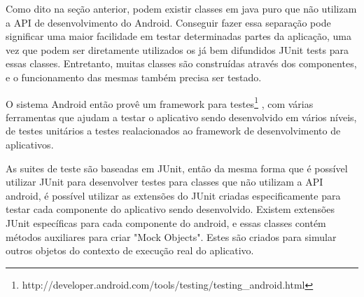 Como dito na seção anterior, podem existir classes em java puro que não utilizam a API de desenvolvimento do Android. Conseguir fazer essa separação pode significar uma maior facilidade em testar determinadas partes da aplicação, uma vez que podem ser diretamente utilizados os já bem difundidos JUnit tests para essas classes. Entretanto, muitas classes são construídas através dos componentes, e o funcionamento das mesmas também precisa ser testado.

O sistema Android então provê um framework para testes\footnote{http://developer.android.com/tools/testing/testing\_android.html} , com várias ferramentas que ajudam a testar o aplicativo sendo desenvolvido em vários níveis, de testes unitários a testes realacionados ao framework de desenvolvimento de aplicativos. 

As suites de teste são baseadas em JUnit, então da mesma forma que é possível utilizar JUnit para desenvolver testes para classes que não utilizam a API android, é possível utilizar as extensões do JUnit criadas especificamente para testar cada componente do aplicativo sendo desenvolvido. Existem extensões JUnit específicas para cada componente do android, e essas classes contém métodos auxiliares para criar "Mock Objects". Estes são criados para simular outros objetos do contexto de execução real do aplicativo.

